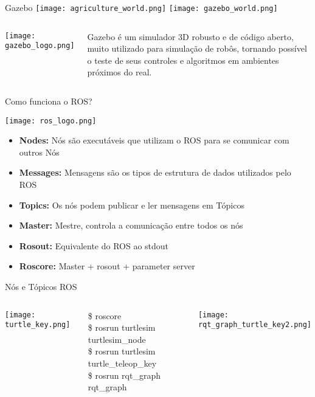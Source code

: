 \begin{frame}[t]{Gazebo} 
  \centering
  \texttt{[image: agriculture\_world.png]}
  \texttt{[image: gazebo\_world.png]}
  
  \begin{columns}
    \texttt{[image: gazebo\_logo.png]}

    
    Gazebo é um simulador 3D robusto e de código aberto, muito utilizado para simulação de robôs, tornando possível o teste de seus controles e algoritmos em ambientes próximos do real.
  \end{columns}

\end{frame}


\begin{frame}[t]{Como funciona o ROS?}

  \texttt{[image: ros\_logo.png]}
  \vspace{.5cm}
  \begin{itemize}
    \item \textbf{Nodes:} Nós são executáveis que utilizam o ROS para se comunicar com outros Nós
    \item \textbf{Messages:} Mensagens são os tipos de estrutura de dados utilizados pelo ROS
    \item \textbf{Topics:} Os nós podem publicar e ler mensagens em Tópicos
    \item \textbf{Master:} Mestre, controla a comunicação entre todos os nós
    \item \textbf{Rosout:} Equivalente do ROS ao stdout
    \item \textbf{Roscore:} Master + rosout + parameter server 
  \end{itemize}

\end{frame}


\begin{frame}[t]{Nós e Tópicos ROS}

  \begin{columns}
    \texttt{[image: turtle\_key.png]} 
    

    \$ roscore
    \\\$ rosrun turtlesim turtlesim\_node
    \\\$ rosrun turtlesim turtle\_teleop\_key
    \\\$ rosrun rqt\_graph rqt\_graph
    
    \vspace{.4cm}
    \hspace*{-.5cm}
    \texttt{[image: rqt\_graph\_turtle\_key2.png]}
  \end{columns}

\end{frame}


